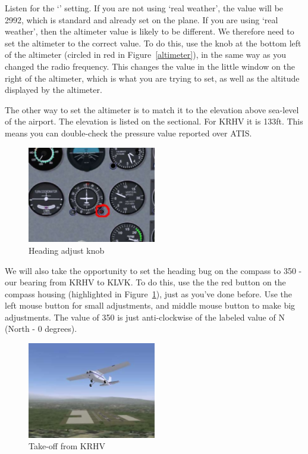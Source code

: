 Listen for the `' setting. If you are not using `real weather', 
the value will be 2992, which is standard and already set on the plane. 
If you are using `real weather', then the altimeter value is likely to be different. 
We therefore need to set the altimeter to the correct value. 
To do this, use the knob at the bottom left of the altimeter 
(circled in red in Figure~\ref{altimeter}), in the same way as 
you changed the radio frequency. This changes the value in the 
little window on the right of the altimeter, which is what you are 
trying to set, as well as the altitude displayed by the altimeter.

The other way to set the altimeter is to match it to the elevation above 
sea-level of the airport. The elevation is listed on the sectional. 
For KRHV it is 133ft. This means you can double-check the pressure value reported over ATIS.

\begin{figure}[!htp]
\centering
\includegraphics[width=0.5\textwidth]{compass}
\caption{Heading adjust knob\label{head}}
\end{figure}

We will also take the opportunity to set the heading bug on the compass to 350 - 
our bearing from KRHV to KLVK. To do this, use the the red button on the compass 
housing (highlighted in Figure~\ref{head}), just as you've done before. 
Use the left mouse button for small adjustments, and middle mouse button 
to make big adjustments. The value of 350 is just anti-clockwise of the 
labeled value of N (North - 0 degrees).

\begin{figure}[!htp]
\centering
\includegraphics[width=0.5\textwidth]{takeoff}
\caption{Take-off from KRHV}
\end{figure}

